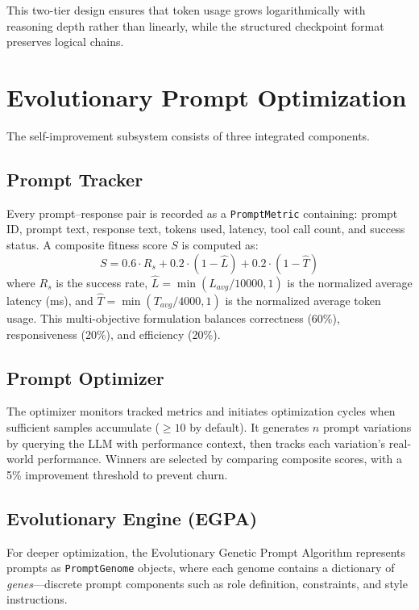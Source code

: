 \documentclass[conference]{IEEEtran}
\begin{document}
This two-tier design ensures that token usage grows logarithmically with reasoning depth rather than linearly, while the structured checkpoint format preserves logical chains.

\section{Evolutionary Prompt Optimization}
\label{sec:evolution}

The self-improvement subsystem consists of three integrated components.

\subsection{Prompt Tracker}

Every prompt--response pair is recorded as a \texttt{PromptMetric} containing: prompt ID, prompt text, response text, tokens used, latency, tool call count, and success status. A composite fitness score $S$ is computed as:
\begin{equation}
S = 0.6 \cdot R_s + 0.2 \cdot (1 - \hat{L}) + 0.2 \cdot (1 - \hat{T})
\label{eq:fitness}
\end{equation}
where $R_s$ is the success rate, $\hat{L} = \min(L_{avg} / 10000, 1)$ is the normalized average latency (ms), and $\hat{T} = \min(T_{avg} / 4000, 1)$ is the normalized average token usage. This multi-objective formulation balances correctness (60\%), responsiveness (20\%), and efficiency (20\%).

\subsection{Prompt Optimizer}

The optimizer monitors tracked metrics and initiates optimization cycles when sufficient samples accumulate ($\geq 10$ by default). It generates $n$ prompt variations by querying the LLM with performance context, then tracks each variation's real-world performance. Winners are selected by comparing composite scores, with a 5\% improvement threshold to prevent churn.

\subsection{Evolutionary Engine (EGPA)}

For deeper optimization, the Evolutionary Genetic Prompt Algorithm represents prompts as \texttt{PromptGenome} objects, where each genome contains a dictionary of \emph{genes}---discrete prompt components such as role definition, constraints, and style instructions.
\end{document}
